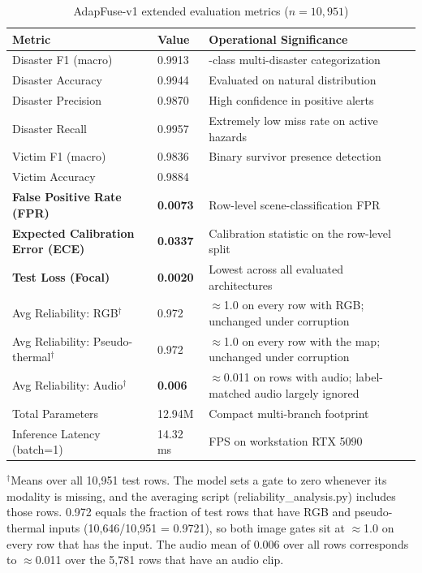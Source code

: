 \begin{table}[H]
\centering
\caption[AdapFuse-v1 extended evaluation metrics]{AdapFuse-v1 extended evaluation metrics ($n=10{,}951$)}
\label{tab:adaptfuse_extended}
\begin{tabular}{@{}ll>{\raggedright\arraybackslash}p{5.2cm}@{}}
\toprule
\textbf{Metric} & \textbf{Value} & \textbf{Operational Significance} \\
\midrule
Disaster F1 (macro)    & 0.9913 & 4-class multi-disaster categorization \\
Disaster Accuracy      & 0.9944 & Evaluated on natural distribution \\
Disaster Precision     & 0.9870 & High confidence in positive alerts \\
Disaster Recall        & 0.9957 & Extremely low miss rate on active hazards \\
Victim F1 (macro)      & 0.9836 & Binary survivor presence detection \\
Victim Accuracy        & 0.9884 & \\
\midrule
\textbf{False Positive Rate (FPR)} & \textbf{0.0073} & Row-level scene-classification FPR \\
\textbf{Expected Calibration Error (ECE)} & \textbf{0.0337} & Calibration statistic on the row-level split \\
\textbf{Test Loss (Focal)} & \textbf{0.0020} & Lowest across all evaluated architectures \\
\midrule
Avg Reliability: RGB$^\dagger$   & 0.972  & $\approx$1.0 on every row with RGB; unchanged under corruption \\
Avg Reliability: Pseudo-thermal$^\dagger$ & 0.972 & $\approx$1.0 on every row with the map; unchanged under corruption \\
Avg Reliability: Audio$^\dagger$ & \textbf{0.006}  & $\approx$0.011 on rows with audio; label-matched audio largely ignored \\
\midrule
Total Parameters       & 12.94M & Compact multi-branch footprint \\
Inference Latency (batch=1) & 14.32 ms & 69.9 FPS on workstation RTX 5090 \\
\bottomrule
\end{tabular}

\vspace{1mm}
\parbox{0.95\textwidth}{\footnotesize $^\dagger$Means over all 10{,}951 test rows. The model sets a gate to zero whenever its modality is missing, and the averaging script (reliability\_analysis.py) includes those rows. 0.972 equals the fraction of test rows that have RGB and pseudo-thermal inputs (10{,}646/10{,}951 = 0.9721), so both image gates sit at $\approx$1.0 on every row that has the input. The audio mean of 0.006 over all rows corresponds to $\approx$0.011 over the 5{,}781 rows that have an audio clip.}
\end{table}

